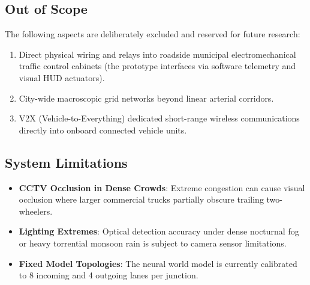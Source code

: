 \subsection{Out of Scope}
The following aspects are deliberately excluded and reserved for future research:
\begin{enumerate}
    \item Direct physical wiring and relays into roadside municipal electromechanical traffic control cabinets (the prototype interfaces via software telemetry and visual HUD actuators).
    \item City-wide macroscopic grid networks beyond linear arterial corridors.
    \item V2X (Vehicle-to-Everything) dedicated short-range wireless communications directly into onboard connected vehicle units.
\end{enumerate}

\subsection{System Limitations}
\begin{itemize}
    \item \textbf{CCTV Occlusion in Dense Crowds}: Extreme congestion can cause visual occlusion where larger commercial trucks partially obscure trailing two-wheelers.
    \item \textbf{Lighting Extremes}: Optical detection accuracy under dense nocturnal fog or heavy torrential monsoon rain is subject to camera sensor limitations.
    \item \textbf{Fixed Model Topologies}: The neural world model is currently calibrated to 8 incoming and 4 outgoing lanes per junction.
\end{itemize}
